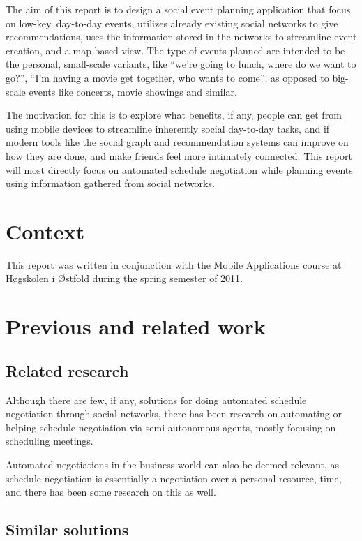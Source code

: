\documentclass[]{report}
\begin{document}
The aim of this report is to design a social event planning application
that focus on low-key, day-to-day events, utilizes already existing social
networks to give recommendations, uses the information stored in the networks to
streamline event creation, and a map-based view. The type of events planned are
intended to be the personal, small-scale variants, like ``we're going to lunch,
where do we want to go?'', ``I'm having a movie get together, who wants to
come'', as opposed to big-scale events like concerts, movie showings and
similar.

The motivation for this is to explore what benefits, if any, people can get from
using mobile devices to streamline inherently social day-to-day tasks, and if
modern tools like the social graph and recommendation systems can improve on how
they are done, and make friends feel more intimately connected. This report will
most directly focus on automated schedule negotiation while planning events
using information gathered from social networks.

\section{Context}
This report was written in conjunction with the Mobile Applications course at
H\o{}gskolen i \O{}stfold\cite{site:mobapp} during the spring semester of 2011.

\section{Previous and related work}

\subsection{Related research}

Although there are few, if any, solutions for doing automated schedule
negotiation through social networks, there has been research on automating or
helping schedule negotiation via semi-autonomous
agents\cite{haynes97:_autom_meetin_sched_system,sen97:_devel,benhassine07},
mostly focusing on scheduling meetings.

Automated negotiations in the business world can also be deemed relevant, as
schedule negotiation is essentially a negotiation over a personal resource,
time, and there has been some research on this as
well\cite{Beam97automatednegotiations:}.

\subsection{Similar solutions}
\end{document}
